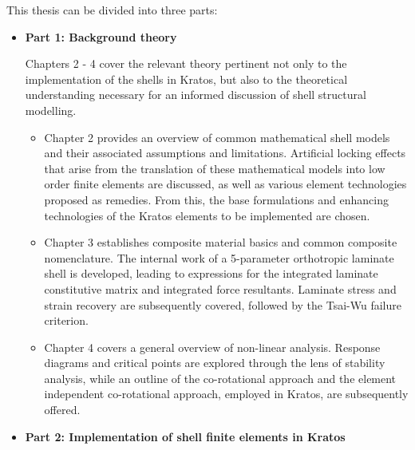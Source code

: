 \newpage
This thesis can be divided into three parts:
\begin{itemize}
	\item \textbf{Part 1: Background theory}
	
	Chapters 2 - 4 cover the relevant theory pertinent not only to the implementation of the shells in Kratos, but also to the theoretical understanding necessary for an informed discussion of shell structural modelling.
	\begin{itemize}
		\item Chapter 2 provides an overview of common mathematical shell models and their associated assumptions and limitations. Artificial locking effects that arise from the translation of these mathematical models into low order finite elements are discussed, as well as various element technologies proposed as remedies. From this, the base formulations and enhancing technologies of the Kratos elements to be implemented are chosen.
		\item Chapter 3 establishes composite material basics and common composite nomenclature. The internal work of a 5-parameter orthotropic laminate shell is developed, leading to expressions for the integrated laminate constitutive matrix and integrated force resultants. Laminate stress and strain recovery are subsequently covered, followed by the Tsai-Wu failure criterion.
		\item Chapter 4 covers a general overview of non-linear analysis. Response diagrams and critical points are explored through the lens of stability analysis, while an outline of the co-rotational approach and the element independent co-rotational approach, employed in Kratos, are subsequently offered.
	\end{itemize}


	\item \textbf{Part 2: Implementation of shell finite elements in Kratos}
	

\end{itemize}
